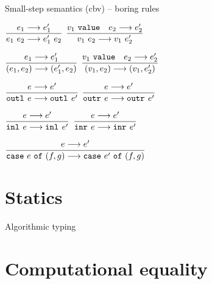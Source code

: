 \documentclass{beamer}
\begin{document}
\begin{frame}{Small-step semantics (cbv) -- boring rules}

\begin{center}
  $\infrule{\smallstep{e_1}{e_1'}}{\smallstep{\app{e_1}{e_2}}{\app{e_1'}{e_2}}}$ \quad
  $\infrule{\val{v_1} \quad \smallstep{e_2}{e_2'}}{\smallstep{\app{v_1}{e_2}}{\app{v_1}{e_2'}}}$

  \vspace{2em}

  $\displaystyle \frac{e_1 \longrightarrow e_1'}{(e_1, e_2) \longrightarrow (e_1', e_2)} \textsc{\footnotesize{}}$ \quad
  $\displaystyle \frac{v_1\ \texttt{value} \quad e_2 \longrightarrow e_2'}{(v_1, e_2) \longrightarrow (v_1, e_2')} \textsc{\footnotesize{}}$

  \vspace{2em}

  $\displaystyle \frac{e \longrightarrow e'}{\texttt{outl}_{}\ e \longrightarrow \texttt{outl}_{}\ e'} \textsc{\footnotesize{}}$ \quad
  $\displaystyle \frac{e \longrightarrow e'}{\texttt{outr}_{}\ e \longrightarrow \texttt{outr}_{}\ e'} \textsc{\footnotesize{}}$

  \vspace{2em}

  $\displaystyle \frac{e \longrightarrow e'}{\texttt{inl}_{}\ e \longrightarrow \texttt{inl}_{}\ e'} \textsc{\footnotesize{}}$ \quad
  $\displaystyle \frac{e \longrightarrow e'}{\texttt{inr}_{}\ e \longrightarrow \texttt{inr}_{}\ e'} \textsc{\footnotesize{}}$

  \vspace{2em}

  $\displaystyle \frac{e \longrightarrow e'}{\texttt{case}\ e\ \texttt{of}\ (f, g) \longrightarrow \texttt{case}\ e'\ \texttt{of}\ (f, g)} \textsc{\footnotesize{}}$

\end{center}

\end{frame}

\section{Statics}

\begin{frame}{Algorithmic typing}

\end{frame}

\section{Computational equality}
\end{document}
